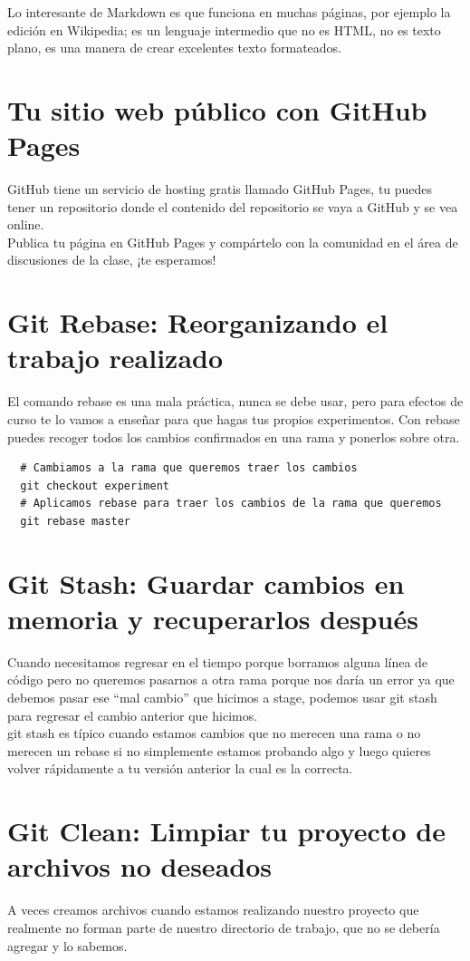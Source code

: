 \documentclass{article}
\begin{document}
Lo interesante de Markdown es que funciona en muchas páginas, por ejemplo la
edición en Wikipedia; es un lenguaje intermedio que no es HTML, no es texto
plano, es una manera de crear excelentes texto formateados.


\section{Tu sitio web público con GitHub Pages}%
GitHub tiene un servicio de hosting gratis llamado GitHub Pages, tu puedes
tener un repositorio donde el contenido del repositorio se vaya a GitHub y se
vea online.\\

Publica tu página en GitHub Pages y compártelo con la comunidad en el área de
discusiones de la clase, ¡te esperamos!


\section{Git Rebase: Reorganizando el trabajo realizado}%
El comando rebase es una mala práctica, nunca se debe usar, pero para efectos
de curso te lo vamos a enseñar para que hagas tus propios experimentos. Con
rebase puedes recoger todos los cambios confirmados en una rama y ponerlos
sobre otra.

\begin{verbatim}
  # Cambiamos a la rama que queremos traer los cambios
  git checkout experiment
  # Aplicamos rebase para traer los cambios de la rama que queremos 
  git rebase master
\end{verbatim}

\section{Git Stash: Guardar cambios en memoria y recuperarlos después}%
Cuando necesitamos regresar en el tiempo porque borramos alguna línea de código
pero no queremos pasarnos a otra rama porque nos daría un error ya que debemos
pasar ese “mal cambio” que hicimos a stage, podemos usar git stash para
regresar el cambio anterior que hicimos.\\

git stash es típico cuando estamos cambios que no merecen una rama o no merecen
un rebase si no simplemente estamos probando algo y luego quieres volver
rápidamente a tu versión anterior la cual es la correcta.

\section{Git Clean: Limpiar tu proyecto de archivos no deseados}%
A veces creamos archivos cuando estamos realizando nuestro proyecto que
realmente no forman parte de nuestro directorio de trabajo, que no se debería
agregar y lo sabemos.\\
\end{document}
